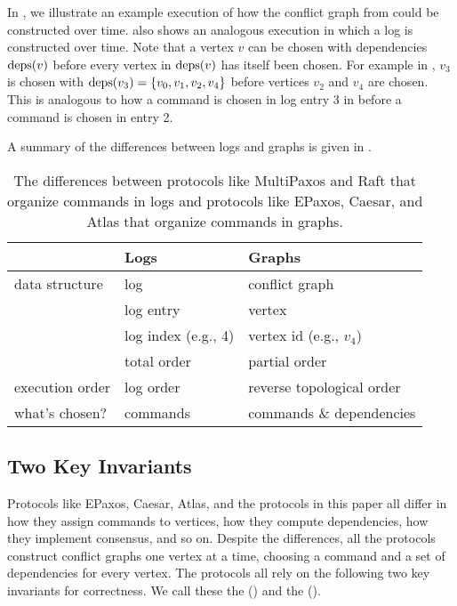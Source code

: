 In , we illustrate an example execution of how
the conflict graph from  could be constructed over time.
 also shows an analogous execution in which a log
is constructed over time. Note that a vertex $v$ can be chosen with
dependencies $\text{deps}(v)$ before every vertex in $\text{deps}(v)$ has itself been
chosen. For example in , $v_3$ is chosen with $\text{deps}(v_3) =
\{v_0, v_1, v_2, v_4\}$ before vertices $v_2$ and $v_4$ are chosen. This is
analogous to how a command is chosen in log entry 3 in  before a
command is chosen in entry 2.

A summary of the differences between logs and graphs is given in
.

{}

\begin{table}
  \caption{%
    The differences between protocols like MultiPaxos and Raft that organize
    commands in logs and protocols like EPaxos, Caesar, and Atlas that organize
    commands in graphs.
  }
  \begin{tabular}{lll}
    \toprule
                    & Logs                & Graphs \\\midrule
    data structure  & log                 & conflict graph \\
                    & log entry           & vertex \\
                    & log index (e.g., 4) & vertex id (e.g., $v_4$) \\
                    & total order         & partial order \\
    execution order & log order           & reverse topological order \\
    what's chosen?  & commands            & commands \& dependencies \\
    \bottomrule
  \end{tabular}
\end{table}

\subsection{Two Key Invariants}
Protocols like EPaxos, Caesar, Atlas, and the \BPaxos{} protocols in this paper
all differ in how they assign commands to vertices, how they compute
dependencies, how they implement consensus, and so on. Despite the differences,
all the protocols construct conflict graphs one vertex at a time, choosing a
command and a set of dependencies for every vertex. The protocols all rely on
the following two key invariants for correctness. We call these the
 () and the
 ().

